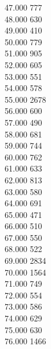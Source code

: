 { 47.000	777 \\
 48.000	630 \\
 49.000	410 \\
 50.000	779 \\
 51.000	905 \\
 52.000	605 \\
 53.000	551 \\
 54.000	578 \\
 55.000	2678 \\
 56.000	600 \\
 57.000	490 \\
 58.000	681 \\
 59.000	744 \\
 60.000	762 \\
 61.000	633 \\
 62.000	813 \\
 63.000	580 \\
 64.000	691 \\
 65.000	471 \\
 66.000	510 \\
 67.000	550 \\
 68.000	522 \\
 69.000	2834 \\
 70.000	1564 \\
 71.000	749 \\
 72.000	554 \\
 73.000	586 \\
 74.000	629 \\
 75.000	630 \\
 76.000	1466 \\
}
